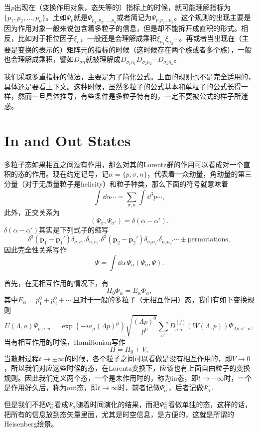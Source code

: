 当$p$出现在（变换作用对象，态矢等的）指标上的时候，就可能理解指标为$\{p_1,p_2,\dots,p_n\}$。比如$\Psi_p$就是$\Psi_{p_1,p_2,\dots,p_n}$或者简记为$\Psi_{p_1p_2\dots p_n}$。这个规则的出现主要是因为作用对象一般来说包含着多粒子的信息，但是却不能拆开成直积的形式。相反，比如对于相位因子$\xi_n$，一般还是会理解成乘积$\xi_{n_1}\xi_{n_2}\cdots$。再或者当出现在（主要是变换的表示的）矩阵元的指标的时候（这时候存在两个族或者多个族），一般也会理解成乘积，譬如$D_{\sigma n}$就被理解成$D_{\sigma_1 n_1}D_{\sigma_2 n_2}\cdots D_{\sigma_k n_k}$。

我们采取多重指标的做法，主要是为了简化公式。上面的规则也不是完全适用的，具体还是要看上下文。这种时候，虽然多粒子的公式基本和单粒子的公式长得一样，然而一旦具体推导，有些条件是多粒子特有的，一定不要被公式的样子所迷惑。

\section{In and Out States}
多粒子态如果相互之间没有作用，那么对其的Lorentz群的作用可以看成对一个直积的态的作用。现在约定记号，记$\alpha=\{p,\sigma,n\}$，代表着一众动量，角动量的第三分量（对于无质量粒子是helicity）和粒子种类，那么下面的符号就意味着
\[\int \dd \alpha \cdots=\sum_{\sigma,n}\int \dd^3 p\cdots,\]
此外，正交关系为
\[
(\Psi_\alpha,\Psi_{\alpha'})=\delta(\alpha-\alpha').
\]
$\delta(\alpha-\alpha')$其实是下列式子的缩写
\[
\delta^3(\bm{p}_1-\bm{p}_1')\delta_{\sigma_1 \sigma_1'}\delta_{n_1 n_1'}
\delta^3(\bm{p}_2-\bm{p}_2')\delta_{\sigma_2 \sigma_2'}\delta_{n_2 n_2'}
\cdots\pm \text{permutations},
\]
因此完全性关系写作
\[
\Psi=\int \dd \alpha\,\Psi_{\alpha}(\Psi_\alpha,\Psi).
\]

首先，在无相互作用的情况下，有
\[
H_0\Phi_\alpha=E_\alpha\Phi_\alpha,
\]
其中$E_\alpha=p^0_1+p^0_2+\cdots$.且对于一般的多粒子（无相互作用）态，我们有如下变换规则
\[
U(\Lambda,a)\Psi_{p,\sigma,n}=\exp(-ia_\mu (\Lambda p)^\mu)\sqrt{\frac{(\Lambda p)^0}{p^0}}\sum_{\sigma'}D^{(j)}_{\sigma' \sigma}\left( W(\Lambda,p)\right)\Psi_{\Lambda p,\sigma',n},
\]
当有相互作用的时候，Hamiltonian写作
\[
	H=H_0+V,
\]
当散射过程$t\to\pm\infty$的时候，各个粒子之间可以看做是没有相互作用的，即$V\to 0$，所以我们对应这些时候的态，在Lorentz变换下，应该也有上面自由粒子的变换规则。因此我们定义两个态，一个是未作用时的，称为in态，即$t\to -\infty$时，一个是作用好久后，称为out态，即$t \to \infty$时，前者记做$\Psi_\alpha^+$，后者记做$\Psi_\alpha^-$.

但是我们不把$\Psi_\alpha^\pm$看成$\Psi_\alpha$随着时间演化的结果，而把$\Psi_\alpha^\pm$看做单独的态，这样的话，把所有的信息放到态矢量里面，尤其是时空信息，是方便的，这就是所谓的Heisenberg绘景。

